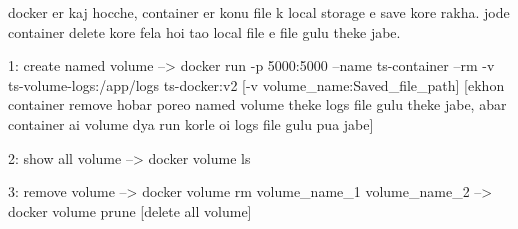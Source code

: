 docker er kaj hocche, container er konu file k local storage e save kore rakha. jode container delete kore fela hoi tao local file e file gulu theke jabe.

1: create named volume
--> docker run -p 5000:5000 --name ts-container --rm -v ts-volume-logs:/app/logs ts-docker:v2  [-v volume_name:Saved_file_path]
[ekhon container remove hobar poreo named volume theke logs file gulu theke jabe, abar container ai volume dya run korle oi logs file gulu pua jabe]

2: show all volume
--> docker volume ls

3: remove volume
--> docker volume rm volume_name_1 volume_name_2
--> docker volume prune [delete all volume]
